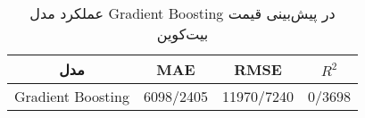 
        \begin{table}[H]
            \centering
            \begin{tabular}{|c|c|c|c|}

                \hline
                \textbf{مدل} & \textbf{MAE} & \textbf{RMSE} & \textbf{ \(R^2\) } \\
                \hline

                Gradient Boosting & 6098/2405 & 11970/7240 & 0/3698 \\
                \hline

            \end{tabular}
            \caption{عملکرد مدل Gradient Boosting در پیش‌بینی قیمت بیت‌کوین}
            \label{tab:gradient_boosting_performance}
        \end{table}
        
